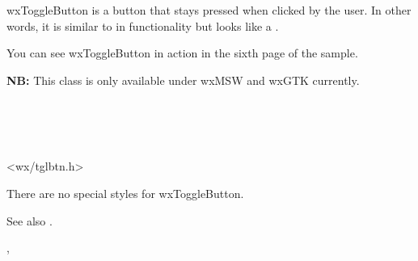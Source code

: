 
\section{}\label{wxtogglebutton}

wxToggleButton is a button that stays pressed when clicked by the user. In
other words, it is similar to  in
functionality but looks like a .

You can see wxToggleButton in action in the sixth page of the 
 sample.

{\bf NB:} This class is only available under wxMSW and wxGTK currently.


\\
\\
\\


<wx/tglbtn.h>


There are no special styles for wxToggleButton.

See also .


\twocolwidtha{7cm}
\begin{twocollist}\itemsep=0pt
\end{twocollist}


, 


\label{wxtogglebuttonconstr}

